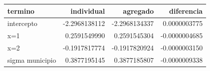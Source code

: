 \begin{tabular}{lrrr}
\toprule
termino & individual & agregado & diferencia \\
\midrule
intercepto & -2.2968138112 & -2.2968134337 & 0.0000003775 \\
x=1 & 0.2591549990 & 0.2591545304 & -0.0000004685 \\
x=2 & -0.1917817774 & -0.1917820924 & -0.0000003150 \\
sigma municipio & 0.3877195145 & 0.3877185807 & -0.0000009338 \\
\bottomrule
\end{tabular}
